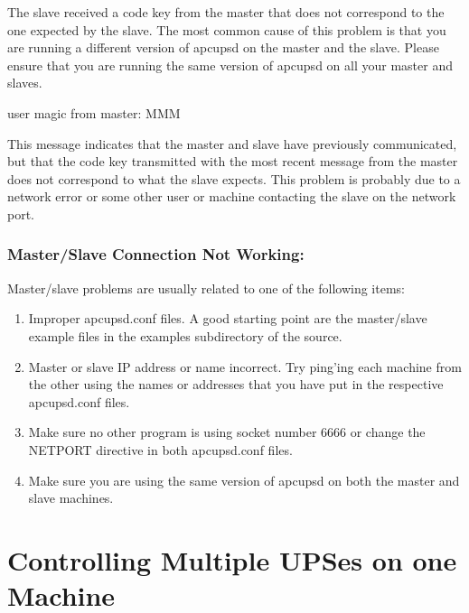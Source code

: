 {{{{{{{{{The slave received a code key from the master that does not correspond to the
one expected by the slave. The most common cause of this problem is that you
are running a different version of apcupsd on the master and the slave. Please
ensure that you are running the same version of apcupsd on all your master and
slaves. 

\label{Bad-user-magic-from-master_003b-MMM}

{\smallBad user magic from master: MMM}

This message indicates that the master and slave have previously communicated,
but that the code key transmitted with the most recent message from the master
does not correspond to what the slave expects. This problem is probably due to
a network error or some other user or machine contacting the slave on the
network port. 

\label{Master_002fSlave-Connection-Not-Working}

\subsubsection*{Master/Slave Connection Not Working:}

Master/slave problems are usually related to one of the following items:  

\begin{enumerate}
\item Improper apcupsd.conf files. A good starting point are the master/slave
   example files in the examples subdirectory of the source.  
\item Master or slave IP address or name incorrect. Try ping'ing each machine
   from the other using the names or addresses that you have put in the
   respective apcupsd.conf files.  
\item Make sure no other program is using socket number 6666 or change the
   NETPORT directive in both apcupsd.conf files.  
\item Make sure you are using the same version of apcupsd on both the master
   and slave machines.  
   \end{enumerate}

\label{Controlling-Multiple-UPSes-on-one-Machine}

\section*{Controlling Multiple UPSes on one Machine}

}}}}}}}}}
